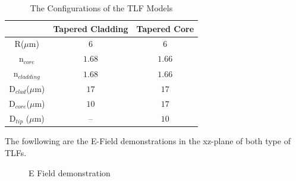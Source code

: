 \begin{table}
\caption{The Configurations of the TLF Models}
\centering
\begin{tabular}{ccc}
\hline
							&Tapered Cladding&Tapered Core\\
\hline
R($\mu$m) & $6$						 &$6$	\\
n$_{core}$&$1.68$&$1.66$\\
n$_{cladding}$&$1.68$&$1.66$\\
D$_{clad}$($\mu$m) &	$17$ &	$17$\\
D$_{core}$($\mu$m) & $10$ &	$17$\\
D$_{tip}$ ($\mu$m) & --   &	$10$\\
\hline
\end{tabular}

\label{tab:model_fiber_configuration}
\end{table}
The fowllowing are the E-Field demonstrations in the xz-plane of both type of TLFs.
\begin{figure}[!ht]
\end{figure}
\begin{figure}[!ht]
	\caption{E Field demonstration}
\end{figure}



